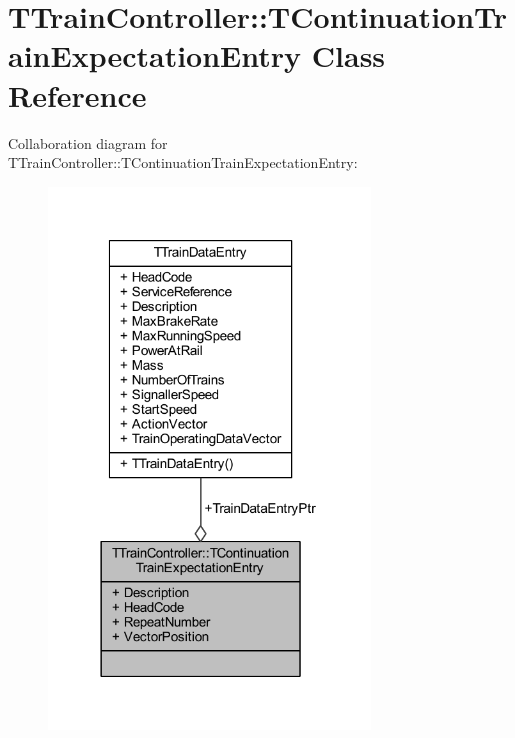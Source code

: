 \hypertarget{class_t_train_controller_1_1_t_continuation_train_expectation_entry}{}\section{T\+Train\+Controller\+:\+:T\+Continuation\+Train\+Expectation\+Entry Class Reference}
\label{class_t_train_controller_1_1_t_continuation_train_expectation_entry}


Collaboration diagram for T\+Train\+Controller\+:\+:T\+Continuation\+Train\+Expectation\+Entry\+:\nopagebreak
\begin{figure}[H]
\begin{center}
\leavevmode
\includegraphics[width=242pt]{class_t_train_controller_1_1_t_continuation_train_expectation_entry__coll__graph}
\end{center}
\end{figure}
